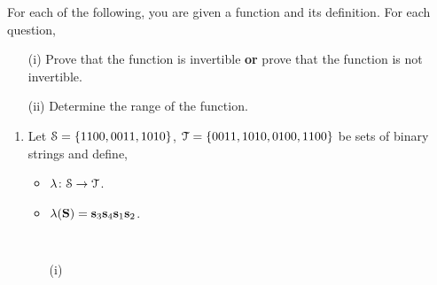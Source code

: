 \documentclass[12pt]{article} %
\begin{document}
\begin{qstn}
  For each of the following, you are given a function and its definition. For each question,
  \begin{enumerate}[label=(\alph*)]
    \item[(i)] Prove that the function is invertible \textbf{or} prove that the function is not invertible.
    \item[(ii)] Determine the range of the function.
  \end{enumerate}

  \begin{enumerate}[label=(\alph*)]
  \item Let $\EuScript{S} = \{1100,0011,1010\} $, $\EuScript{T} = \{0011,1010,0100,1100\}$ be sets of binary
    strings and define,
    \begin{itemize}
      \item $\lambda \colon \EuScript{S} \to \EuScript{T}$.
      \item $\lambda(\textbf{S}) = \vb s_3\vb s_4\vb s_1 \vb s_2$.
  \end{itemize}

  \begin{solution} \texttt{  }
    \begin{enumerate}[label=(\alph*)]
      \item[(i)] \texttt{  }
          \begin{center}
\end{center}
\end{enumerate}
\end{solution}
\end{enumerate}
\end{qstn}
\end{document}
